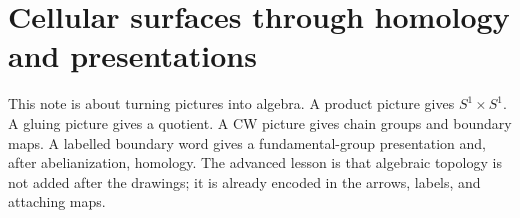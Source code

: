 \section{Cellular surfaces through homology and presentations}

This note is about turning pictures into algebra.  A product picture gives \(S^1\times S^1\).  A gluing picture gives a quotient.  A CW picture gives chain groups and boundary maps.  A labelled boundary word gives a fundamental-group presentation and, after abelianization, homology.  The advanced lesson is that algebraic topology is not added after the drawings; it is already encoded in the arrows, labels, and attaching maps.

